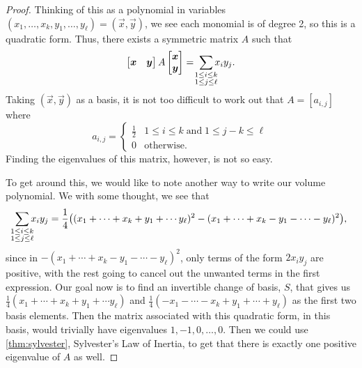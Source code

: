 \documentclass[12pt,oneside]{../../sfsuthesis}
\begin{document}
\begin{proof}
    Thinking of this as a polynomial in variables \( (x_1, \dots, x_k, y_1, \dots, y_\ell) = (\vec{x}, \vec{y}) \), we see each monomial is of degree 2, so this is a quadratic form.
    Thus, there exists a symmetric matrix \( A \) such that
    \[
        \begin{bmatrix}
            \vec{x} & \vec{y}
        \end{bmatrix}
        A
        \begin{bmatrix}
            \vec{x} \\ \vec{y}
        \end{bmatrix}
        = \; \sum_{\mathclap{\substack{1 \leq i \leq k \\ 1 \leq j \leq \ell}}} x_i y_j.
    \]
    Taking \( (\vec{x}, \vec{y}) \) as a basis, it is not too difficult to work out that \( A = [a_{i,j}] \) where
    \[
        a_{i,j} =
        \begin{cases}
            \frac{1}{2} & 1 \leq i \leq k \;\text{and} \; 1 \leq j - k \leq \ell \\
            0           & \text{otherwise}.
        \end{cases}
    \]
    Finding the eigenvalues of this matrix, however, is not so easy.

    To get around this, we would like to note another way to write our volume polynomial.
    We with some thought, we see that
    \[
        \sum_{\mathclap{\substack{1 \leq i \leq k \\ 1 \leq j \leq \ell}}} x_i y_j
        = \frac{1}{4} \big((x_1 + \cdots + x_k + y_1 + \cdots y_\ell)^2 - (x_1 + \cdots + x_k - y_1 - \cdots - y_\ell)^2\big),
    \]
    since in \( -(x_1 + \cdots + x_k - y_1 - \cdots - y_\ell)^2 \), only terms of the form \( 2x_i y_j \) are positive, with the rest going to cancel out the unwanted terms in the first expression.
    Our goal now is to find an invertible change of basis, \( S \), that gives us \( \frac{1}{4}(x_1 + \cdots + x_k + y_1 + \cdots y_\ell) \) and \( \frac{1}{4}(-x_1 - \cdots - x_k + y_1 + \cdots + y_\ell) \) as the first two basis elements.
    Then the matrix associated with this quadratic form, in this basis, would trivially have eigenvalues \( 1, -1, 0, \dots, 0 \).
    Then we could use \th\ref{thm:sylvester}, Sylvester's Law of Inertia, to get that there is exactly one positive eigenvalue of \( A \) as well.


\end{proof}
\end{document}
